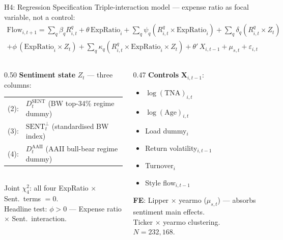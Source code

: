 \documentclass[10pt, aspectratio=169]{beamer}
\begin{document}
\begin{frame}[shrink=5]{H4: Regression Specification}
  \small Triple-interaction model — expense ratio as focal variable, not a control:
  \vspace{-4pt}
  \begin{multline*}
    \text{Flow}_{i,t+1} = \sum_q \beta_q R^q_{i,t}
    + \theta\,\text{ExpRatio}_i
    + \sum_q \psi_q (R^q_{i,t}\times\text{ExpRatio}_i)
    + \sum_q \delta_q (R^q_{i,t}\times Z_t) \\
    + \phi\,(\text{ExpRatio}_i\times Z_t)
    + \sum_q \kappa_q (R^q_{i,t}\times\text{ExpRatio}_i\times Z_t)
    + \theta'\,X_{i,t-1} + \mu_{s,t} + \varepsilon_{i,t}
  \end{multline*}
  \vspace{-6pt}
  \begin{columns}[T]
    \begin{column}{0.50\textwidth}
      \footnotesize\textbf{Sentiment state} $Z_t$ — three columns:
      \vspace{2pt}\\
      \begin{tabular}{@{}ll@{}}
        (2): & $D^{\text{SENT}}_t$ (BW top-34\% regime dummy) \\
        (3): & $\text{SENT}^\perp_t$ (standardised BW index) \\
        (4): & $D^{\text{AAII}}_t$ (AAII bull-bear regime dummy) \\
      \end{tabular}\\[2pt]
      \vspace{4pt}
      \footnotesize Joint $\chi^2_4$: all four ExpRatio $\times$ Sent.\ terms $= 0$.\\
      Headline test: $\phi > 0$ — Expense ratio $\times$ Sent.\ interaction.
    \end{column}
    \begin{column}{0.47\textwidth}
      \footnotesize\textbf{Controls} $\mathbf{X}_{i,t-1}$:
      \begin{itemize}\itemsep0pt
        \item $\log(\text{TNA})_{i,t}$
        \item $\log(\text{Age})_{i,t}$
        \item Load dummy$_i$
        \item Return volatility$_{i,t-1}$
        \item Turnover$_i$
        \item Style flow$_{i,t-1}$
      \end{itemize}
      \footnotesize\textbf{FE}: Lipper $\times$ yearmo ($\mu_{s,t}$) — absorbs sentiment main effects.\\
      Ticker $\times$ yearmo clustering. $N=232{,}168$.\\
      
    \end{column}
  \end{columns}
\end{frame}
\end{document}
